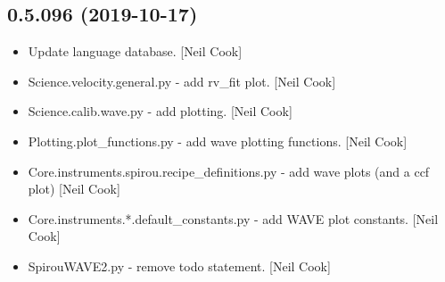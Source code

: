 \documentclass[a4paper,10pt,english]{report}
\begin{document}
\subsection{0.5.096 (2019-10-17)}
\label{\detokenize{misc/changelog:id45}}\begin{itemize}
\item {} 
Update language database. {[}Neil Cook{]}

\item {} 
Science.velocity.general.py - add rv\_fit plot. {[}Neil Cook{]}

\item {} 
Science.calib.wave.py - add plotting. {[}Neil Cook{]}

\item {} 
Plotting.plot\_functions.py - add wave plotting functions. {[}Neil Cook{]}

\item {} 
Core.instruments.spirou.recipe\_definitions.py - add wave plots (and a
ccf plot) {[}Neil Cook{]}

\item {} 
Core.instruments.*.default\_constants.py - add WAVE plot constants.
{[}Neil Cook{]}

\item {} 
SpirouWAVE2.py - remove todo statement. {[}Neil Cook{]}

\end{itemize}
\end{document}
